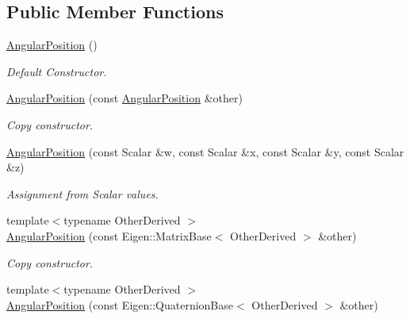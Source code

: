 \subsection*{Public Member Functions}
\begin{DoxyCompactItemize}
\item 
\hyperlink{classow__core_1_1AngularPosition_a57812720a8d02ece9fff081bcb67603a}{Angular\+Position} ()\hypertarget{classow__core_1_1AngularPosition_a57812720a8d02ece9fff081bcb67603a}{}\label{classow__core_1_1AngularPosition_a57812720a8d02ece9fff081bcb67603a}

\begin{DoxyCompactList}\small\item\em Default Constructor. \end{DoxyCompactList}\item 
\hyperlink{classow__core_1_1AngularPosition_a04faaebb9de11a515c009793f5f1b5e8}{Angular\+Position} (const \hyperlink{classow__core_1_1AngularPosition}{Angular\+Position} \&other)\hypertarget{classow__core_1_1AngularPosition_a04faaebb9de11a515c009793f5f1b5e8}{}\label{classow__core_1_1AngularPosition_a04faaebb9de11a515c009793f5f1b5e8}

\begin{DoxyCompactList}\small\item\em Copy constructor. \end{DoxyCompactList}\item 
\hyperlink{classow__core_1_1AngularPosition_ab219dc83bafbd964f7fd8bdc2ae9d846}{Angular\+Position} (const Scalar \&w, const Scalar \&x, const Scalar \&y, const Scalar \&z)
\begin{DoxyCompactList}\small\item\em Assignment from Scalar values. \end{DoxyCompactList}\item 
{\footnotesize template$<$typename Other\+Derived $>$ }\\\hyperlink{classow__core_1_1AngularPosition_ad748e75885db5305e50d88f112ce022c}{Angular\+Position} (const Eigen\+::\+Matrix\+Base$<$ Other\+Derived $>$ \&other)
\begin{DoxyCompactList}\small\item\em Copy constructor. \end{DoxyCompactList}\item 
{\footnotesize template$<$typename Other\+Derived $>$ }\\\hyperlink{classow__core_1_1AngularPosition_ad0343736cc6a1fc3953294727b3721d6}{Angular\+Position} (const Eigen\+::\+Quaternion\+Base$<$ Other\+Derived $>$ \&other)\hypertarget{classow__core_1_1AngularPosition_ad0343736cc6a1fc3953294727b3721d6}{}\label{classow__core_1_1AngularPosition_ad0343736cc6a1fc3953294727b3721d6}


\end{DoxyCompactItemize}
